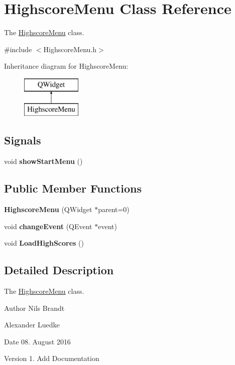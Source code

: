 \hypertarget{classHighscoreMenu}{\section{Highscore\-Menu Class Reference}
\label{classHighscoreMenu}
}


The \hyperlink{classHighscoreMenu}{Highscore\-Menu} class.  




{\ttfamily \#include $<$Highscore\-Menu.\-h$>$}

Inheritance diagram for Highscore\-Menu\-:\begin{figure}[H]
\begin{center}
\leavevmode
\includegraphics[height=2.000000cm]{classHighscoreMenu}
\end{center}
\end{figure}
\subsection*{Signals}
\begin{DoxyCompactItemize}
\item 
\hypertarget{classHighscoreMenu_acfc660f3078cc3e42a2b0be20f534e59}{void {\bfseries show\-Start\-Menu} ()}\label{classHighscoreMenu_acfc660f3078cc3e42a2b0be20f534e59}

\end{DoxyCompactItemize}
\subsection*{Public Member Functions}
\begin{DoxyCompactItemize}
\item 
\hypertarget{classHighscoreMenu_afffd6ba37985beae539f7d143de2201d}{{\bfseries Highscore\-Menu} (Q\-Widget $\ast$parent=0)}\label{classHighscoreMenu_afffd6ba37985beae539f7d143de2201d}

\item 
\hypertarget{classHighscoreMenu_ad71f69706ab1969e180abc4794f946c9}{void {\bfseries change\-Event} (Q\-Event $\ast$event)}\label{classHighscoreMenu_ad71f69706ab1969e180abc4794f946c9}

\item 
\hypertarget{classHighscoreMenu_ac026cfd99873bd6d7283b5d8060e7d8f}{void {\bfseries Load\-High\-Scores} ()}\label{classHighscoreMenu_ac026cfd99873bd6d7283b5d8060e7d8f}

\end{DoxyCompactItemize}


\subsection{Detailed Description}
The \hyperlink{classHighscoreMenu}{Highscore\-Menu} class. 

\begin{DoxyAuthor}{Author}
Nils Brandt 

Alexander Luedke
\end{DoxyAuthor}
\begin{DoxyDate}{Date}
08. August 2016
\end{DoxyDate}
\begin{DoxyVersion}{Version}
1. Add Documentation 
\end{DoxyVersion}

